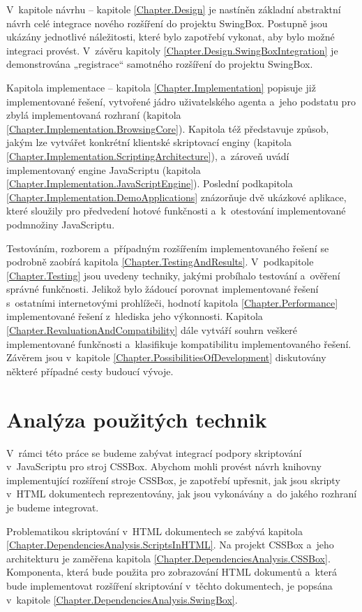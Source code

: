 V~kapitole návrhu -- kapitole \ref{Chapter.Design} je nastíněn základní abstraktní návrh celé integrace nového rozšíření do projektu SwingBox. Postupně jsou ukázány jednotlivé náležitosti, které bylo zapotřebí vykonat, aby bylo možné integraci provést. V~závěru kapitoly \ref{Chapter.Design.SwingBoxIntegration} je demonstrována „registrace“ samotného rozšíření do projektu SwingBox.

Kapitola implementace -- kapitola \ref{Chapter.Implementation} popisuje již implementované řešení, vytvořené jádro uživatelského agenta a~jeho podstatu pro zbylá implementovaná rozhraní (kapitola \ref{Chapter.Implementation.BrowsingCore}). Kapitola též představuje způsob, jakým lze vytvářet konkrétní klientské skriptovací enginy (kapitola \ref{Chapter.Implementation.ScriptingArchitecture}), a~zároveň uvádí implementovaný engine JavaScriptu (kapitola \ref{Chapter.Implementation.JavaScriptEngine}). Poslední podkapitola \ref{Chapter.Implementation.DemoApplications} znázorňuje dvě ukázkové aplikace, které sloužily pro předvedení hotové funkčnosti a~k~otestování implementované podmnožiny JavaScriptu.

\clearpage

Testováním, rozborem a~případným rozšířením implementovaného řešení se podrobně zaobírá kapitola \ref{Chapter.TestingAndResults}. V~podkapitole \ref{Chapter.Testing} jsou uvedeny techniky, jakými probíhalo testování a~ověření správné funkčnosti. Jelikož bylo žádoucí porovnat implementované řešení s~ostatními internetovými prohlížeči, hodnotí kapitola \ref{Chapter.Performance} implementované řešení z~hlediska jeho výkonnosti. Kapitola \ref{Chapter.RevaluationAndCompatibility} dále vytváří souhrn veškeré implementované funkčnosti a~klasifikuje kompatibilitu implementovaného řešení. Závěrem jsou v~kapitole \ref{Chapter.PossibilitiesOfDevelopment} diskutovány některé případné cesty budoucí vývoje.

\chapter{Analýza použitých technik}
\label{Chapter.DependenciesAnalysis}

V~rámci této práce se budeme zabývat integrací podpory skriptování v~JavaScriptu pro stroj CSSBox. Abychom mohli provést návrh knihovny implementující rozšíření stroje CSSBox, je zapotřebí upřesnit, jak jsou skripty v~HTML dokumentech reprezentovány, jak jsou vykonávány a~do jakého rozhraní je budeme integrovat.

Problematikou skriptování v~HTML dokumentech se zabývá kapitola \ref{Chapter.DependenciesAnalysis.ScriptsInHTML}. Na projekt CSSBox a~jeho architekturu je zaměřena kapitola \ref{Chapter.DependenciesAnalysis.CSSBox}. Komponenta, která bude použita pro zobrazování HTML dokumentů a~která bude implementovat rozšíření skriptování v~těchto dokumentech, je popsána v~kapitole \ref{Chapter.DependenciesAnalysis.SwingBox}. 

